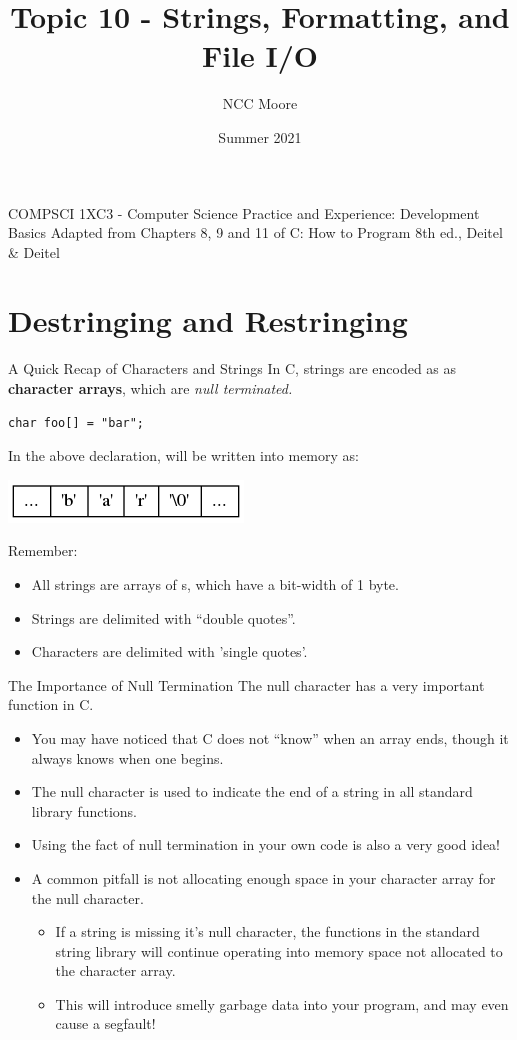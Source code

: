 \documentclass[11pt]{beamer}
\author{NCC Moore}
\title{Topic 10 - Strings, Formatting, and File I/O}
\institute{McMaster University}
\date{Summer 2021}
\let\OldTexttt\texttt
\renewcommand{\texttt}[1]{\OldTexttt{\color{teal}{#1}}}
\begin{document}
\begin{frame}
\center
COMPSCI 1XC3 - Computer Science Practice and Experience: 
Development Basics
\titlepage
Adapted from Chapters 8, 9 and 11 of C: How to Program 8th ed., Deitel \& Deitel
\end{frame}

\begin{frame}
\tableofcontents
\end{frame}

\section[Conversions]{Destringing and Restringing}
\begin{frame}[fragile=singleslide]{A Quick Recap of Characters and Strings}
In C, strings are encoded as as \textbf{character arrays}, which are \emph{null terminated.} 
\begin{lstlisting}[style=C]
char foo[] = "bar";
\end{lstlisting}
In the above declaration, \texttt{foo} will be written into memory as:
\begin{center}
\includegraphics[scale=0.5]{string.png}
\end{center}
Remember:
\begin{itemize}
\item All strings are arrays of \texttt{char}s, which have a bit-width of 1 byte.  
\item Strings are delimited with ``double quotes''.
\item Characters are delimited with 'single quotes'.
\end{itemize}
\end{frame}

\begin{frame}{The Importance of Null Termination}
The null character has a very important function in C.
\begin{itemize}
\item You may have noticed that C does not ``know'' when an array ends, though it always knows when one begins.  
\item The null character \texttt{\textbackslash 0} is used to indicate the end of a string in all standard library functions.
\item Using the fact of null termination in your own code is also a very good idea! 
\item A common pitfall is not allocating enough space in your character array for the null character.  
\begin{itemize}
\item If a string is missing it's null character, the functions in the standard string library will continue operating into memory space not allocated to the character array.
\item This will introduce smelly garbage data into your program, and may even cause a segfault! 
\end{itemize}
\end{itemize}
\end{frame}
\end{document}
